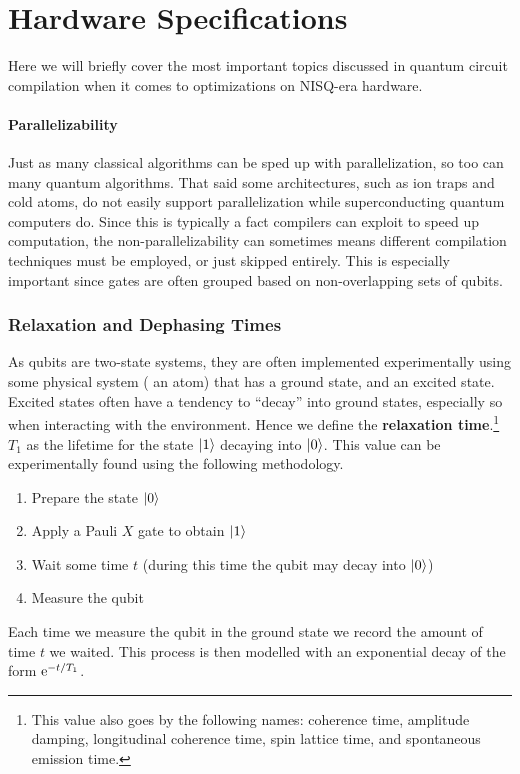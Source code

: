 \section{Hardware Specifications}

Here we will briefly cover the most important topics discussed in quantum circuit compilation when it comes to optimizations on \ac{NISQ}-era hardware.

\paragraph{Parallelizability}
Just as many classical algorithms can be sped up with parallelization, so too can many quantum algorithms.
That said some architectures, such as ion traps and cold atoms, do not easily support parallelization while superconducting quantum computers do.
Since this is typically a fact compilers can exploit to speed up computation, the non-parallelizability can sometimes means different compilation techniques must be employed, or just skipped entirely.
This is especially important since gates are often grouped based on non-overlapping sets of qubits.

\subsubsection{Relaxation and Dephasing Times}\label{sec:Ttimes}

As qubits are two-state systems, they are often implemented experimentally using some physical system (\eg{} an atom) that has a ground state, and an excited state.
Excited states often have a tendency to ``decay'' into ground states, especially so when interacting with the environment.
Hence we define the \textbf{relaxation time}.\footnote{This value also goes by the following names: coherence time, amplitude damping, longitudinal coherence time, spin lattice time, and spontaneous emission time.} $T_1$ as the lifetime for the state $\ket{1}$ decaying into $\ket{0}$.
This value can be experimentally found using the following methodology.
\begin{enumerate}
    \item Prepare the state $\ket{0}$
    \item Apply a Pauli $X$ gate to obtain $\ket{1}$
    \item Wait some time $t$ (during this time the qubit may decay into $\ket{0}$)
    \item Measure the qubit
\end{enumerate}
Each time we measure the qubit in the ground state we record the amount of time $t$ we waited.
This process is then modelled with an exponential decay of the form $\mathrm{e}^{-t/T_1}$.

